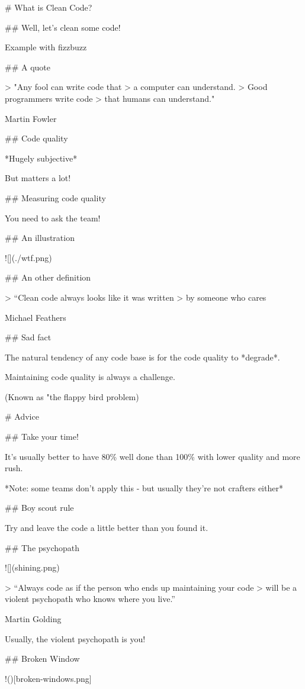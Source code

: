
#  What is Clean Code?

## Well, let's clean some code!

Example with fizzbuzz

## A quote

> "Any fool can write code that
> a computer can understand.
> Good programmers write code
> that humans can understand."

Martin Fowler

## Code quality

*Hugely subjective*

But matters a lot!

## Measuring code quality

You need to ask the team!

## An illustration

![](./wtf.png)

## An other definition

> “Clean code always looks like it was written
> by someone who cares

Michael Feathers

## Sad fact

The natural tendency of any code base is for the code quality to *degrade*.

Maintaining code quality is always a challenge.

(Known as "the flappy bird problem)

# Advice

## Take your time!

It's usually better to have 80\% well done than 100\% with lower quality
and more rush.

*Note: some teams don't apply this - but usually they're not crafters
either*

## Boy scout rule

Try and leave the code a little better than you found it.


## The psychopath

![](shining.png)

> “Always code as if the person who ends up maintaining your code
> will be a violent psychopath who knows where you live.”

Martin Golding

Usually, the violent psychopath is you!

## Broken Window

!()[broken-windows.png]

